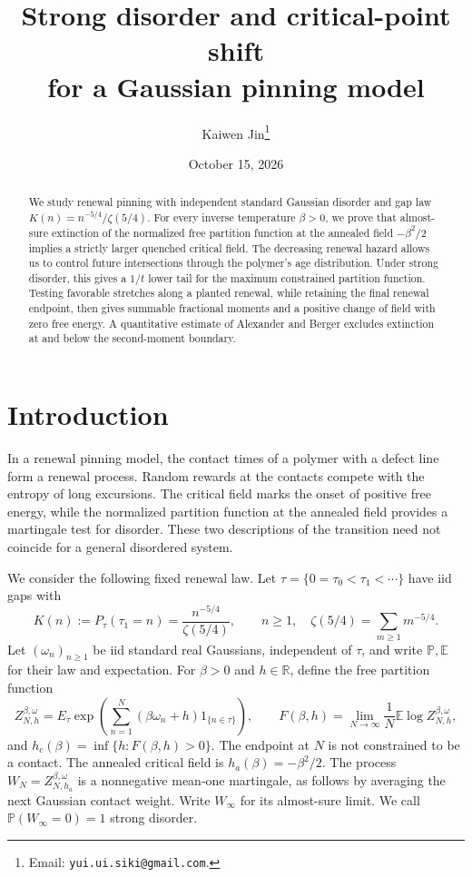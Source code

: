 \documentclass[11pt]{article}
\title{Strong disorder and critical-point shift\\for a Gaussian pinning model}
\author{Kaiwen Jin\thanks{Email: \texttt{yui.ui.siki@gmail.com}.}}
\date{October 15, 2026}
\theoremstyle{remark}
\numberwithin{equation}{section}
\newcommand{\E}{\mathbb E}
\newcommand{\Penv}{\mathbb P}
\begin{document}
\maketitle
\begin{abstract}
We study renewal pinning with independent standard Gaussian disorder and gap
law $K(n)=n^{-5/4}/\zeta(5/4)$. For every inverse temperature $\beta>0$,
we prove that almost-sure extinction of the normalized free partition
function at the annealed field $-\beta^2/2$ implies a strictly larger quenched
critical field. The decreasing renewal hazard allows us to control future
intersections through the polymer's age distribution. Under strong disorder,
this gives a $1/t$ lower tail for the maximum constrained partition function.
Testing favorable stretches along a planted renewal, while retaining the
final renewal endpoint, then gives summable fractional moments and a positive
change of field with zero free energy. A quantitative estimate of Alexander
and Berger excludes extinction at and below the second-moment boundary.
\end{abstract}

\section{Introduction}\label{sec:intro}

In a renewal pinning model, the contact times of a polymer with a defect
line form a renewal process. Random rewards at the contacts compete with the
entropy of long excursions. The critical field marks the onset of positive
free energy, while the normalized partition function at the annealed field
provides a martingale test for disorder. These two descriptions of the
transition need not coincide for a general disordered system.

We consider the following fixed renewal law. Let
$\tau=\{0=\tau_0<\tau_1<\cdots\}$ have iid gaps with
\begin{equation}\label{eq:K}
 K(n):=P_\tau(\tau_1=n)=\frac{n^{-5/4}}{\zeta(5/4)},\qquad n\ge1,
 \quad \zeta(5/4)=\sum_{m\ge1}m^{-5/4}.
\end{equation}
Let $(\omega_n)_{n\ge1}$ be iid standard real Gaussians, independent of
$\tau$, and write $\Penv,\E$ for their law and expectation. For
$\beta>0$ and $h\in\mathbb R$, define the free partition function
\begin{equation}\label{eq:model}
 Z_{N,h}^{\beta,\omega}=E_\tau\exp\!\left(
        \sum_{n=1}^N(\beta\omega_n+h)1_{\{n\in\tau\}}\right),
 \qquad
 F(\beta,h)=\lim_{N\to\infty}\frac1N\E\log Z_{N,h}^{\beta,\omega},
\end{equation}
and $h_c(\beta)=\inf\{h:F(\beta,h)>0\}$. The endpoint at $N$ is not
constrained to be a contact. The annealed critical field is
$h_a(\beta)=-\beta^2/2$. The process
$W_N=Z_{N,h_a}^{\beta,\omega}$ is a nonnegative mean-one martingale,
as follows by averaging the next Gaussian contact weight. Write $W_\infty$
for its almost-sure limit. We call
$\Penv(W_\infty=0)=1$ strong disorder.
\end{document}
